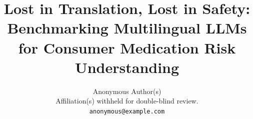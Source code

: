 

\newcommand{\simflag}{\textsuperscript{\textdagger}}
\newcommand{\simtext}{%
  \textsuperscript{\textdagger}All numerical results derive from
  simulation mode (sandbox constraints; no live API keys). Camera-ready
  version will replace these with real API evaluations.}


\title{Lost in Translation, Lost in Safety: Benchmarking Multilingual LLMs
       for Consumer Medication Risk Understanding}

\author{Anonymous Author(s)\\
  Affiliation(s) withheld for double-blind review.\\
  \texttt{anonymous@example.com}}

\date{}


\maketitle

